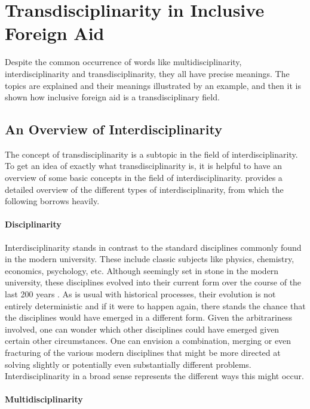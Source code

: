\documentclass[a4paper]{article}
\begin{document}
\newpage

\section{Transdisciplinarity in Inclusive Foreign Aid}

Despite the common occurrence of words like multidisciplinarity,
interdisciplinarity and transdisciplinarity, they all have precise meanings.
The topics are explained and their meanings illustrated by an example, and
then it is shown how inclusive foreign aid is a transdisciplinary field.

\subsection{An Overview of Interdisciplinarity}

The concept of transdisciplinarity is a subtopic in the field of
interdisciplinarity. To get an idea of exactly what transdisciplinarity is, it
is helpful to have an overview of some basic concepts in the field of
interdisciplinarity. \cite{klein2010taxonomy} provides a detailed overview of
the different types of interdisciplinarity, from which the following borrows
heavily.

\paragraph{Disciplinarity}

Interdisciplinarity stands in contrast to the standard disciplines commonly
found in the modern university. These include classic subjects like physics,
chemistry, economics, psychology, etc. Although seemingly set in stone in the
modern university, these disciplines evolved into their current form over the
course of the last 200 years \citep{weingart2010short}. As is usual with
historical processes, their evolution is not entirely deterministic and if it
were to happen again, there stands the chance that the disciplines would have
emerged in a different form. Given the arbitrariness involved, one can wonder
which other disciplines could have emerged given certain other circumstances.
One can envision a combination, merging or even fracturing of the various
modern disciplines that might be more directed at solving slightly or
potentially even substantially different problems. Interdisciplinarity in a
broad sense represents the different ways this might occur.

\paragraph{Multidisciplinarity}
\end{document}
